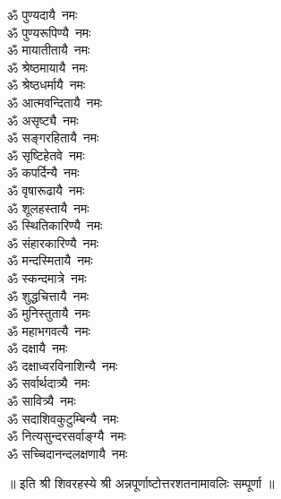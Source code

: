 \begin{multicols}{2}
\begin{flushleft}
ॐ पुण्यदायै~नमः\\
ॐ पुण्यरूपिण्यै~नमः\\
ॐ मायातीतायै~नमः\\
ॐ श्रेष्ठमायायै~नमः\\
ॐ श्रेष्ठधर्मायै~नमः\\
ॐ आत्मवन्दितायै~नमः\\
ॐ असृष्ट्यै~नमः\\
ॐ सङ्गरहितायै~नमः\hfill{}\\
ॐ सृष्टिहेतवे~नमः\\
ॐ कपर्दिन्यै~नमः\\
ॐ वृषारूढायै~नमः\\
ॐ शूलहस्तायै~नमः\\
ॐ स्थितिकारिण्यै~नमः\\
ॐ संहारकारिण्यै~नमः\\
ॐ मन्दस्मितायै~नमः\\
ॐ स्कन्दमात्रे~नमः\\
ॐ शुद्धचित्तायै~नमः\\
ॐ मुनिस्तुतायै~नमः\hfill{}\\
ॐ महाभगवत्यै~नमः\\
ॐ दक्षायै~नमः\\
ॐ दक्षाध्वरविनाशिन्यै~नमः\\
ॐ सर्वार्थदात्र्यै~नमः\\
ॐ सावित्र्यै~नमः\\
ॐ सदाशिवकुटुम्बिन्यै~नमः\\
ॐ नित्यसुन्दरसर्वाङ्ग्यै~नमः\\
ॐ सच्चिदानन्दलक्षणायै~नमः\\
\end{flushleft}
\end{multicols}
\centerline{॥ इति श्री शिवरहस्ये श्री अन्नपूर्णाष्टोत्तरशतनामावलिः सम्पूर्णा ॥}
